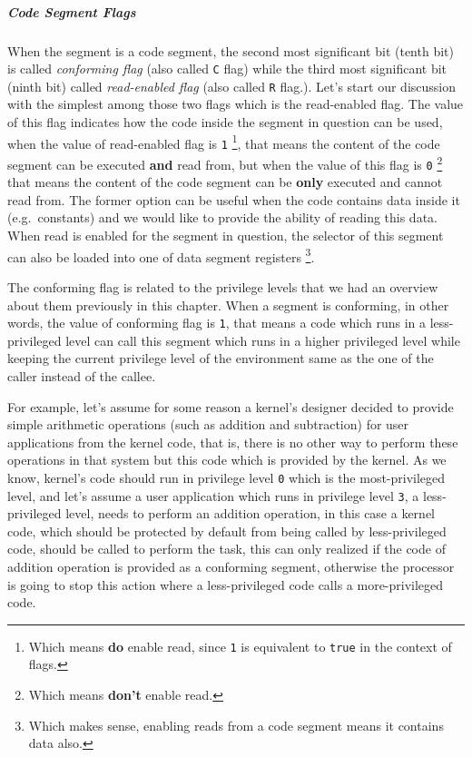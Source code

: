 \subparagraph{Code Segment Flags}\label{code-segment-flags}

When the segment is a code segment, the second most significant bit
(tenth bit) is called \emph{conforming flag} (also called \lstinline!C!
flag) while the third most significant bit (ninth bit) called
\emph{read-enabled flag} (also called \lstinline!R! flag.). Let's start
our discussion with the simplest among those two flags which is the
read-enabled flag. The value of this flag indicates how the code inside
the segment in question can be used, when the value of read-enabled flag
is \lstinline!1! \footnote{Which means \textbf{do} enable read, since
  \lstinline!1! is equivalent to \lstinline!true! in the context of
  flags.}, that means the content of the code segment can be executed
\textbf{and} read from, but when the value of this flag is \lstinline!0!
\footnote{Which means \textbf{don't} enable read.} that means the
content of the code segment can be \textbf{only} executed and cannot
read from. The former option can be useful when the code contains data
inside it (e.g.~constants) and we would like to provide the ability of
reading this data. When read is enabled for the segment in question, the
selector of this segment can also be loaded into one of data segment
registers \footnote{Which makes sense, enabling reads from a code
  segment means it contains data also.}.

The conforming flag is related to the privilege levels that we had an
overview about them previously in this chapter. When a segment is
conforming, in other words, the value of conforming flag is
\lstinline!1!, that means a code which runs in a less-privileged level
can call this segment which runs in a higher privileged level while
keeping the current privilege level of the environment same as the one
of the caller instead of the callee.

For example, let's assume for some reason a kernel's designer decided to
provide simple arithmetic operations (such as addition and subtraction)
for user applications from the kernel code, that is, there is no other
way to perform these operations in that system but this code which is
provided by the kernel. As we know, kernel's code should run in
privilege level \lstinline!0! which is the most-privileged level, and
let's assume a user application which runs in privilege level
\lstinline!3!, a less-privileged level, needs to perform an addition
operation, in this case a kernel code, which should be protected by
default from being called by less-privileged code, should be called to
perform the task, this can only realized if the code of addition
operation is provided as a conforming segment, otherwise the processor
is going to stop this action where a less-privileged code calls a
more-privileged code.


